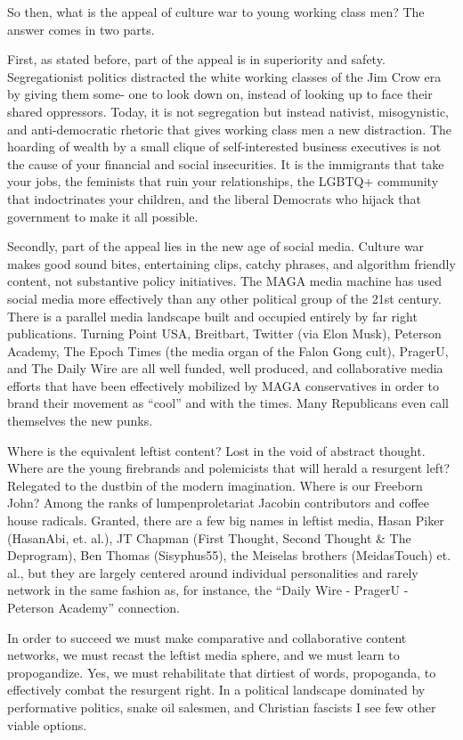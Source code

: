 \documentclass[
]{book}
\begin{document}
So then, what is the appeal of culture war to young working class men? The answer comes in two parts.

First, as stated before, part of the appeal is in superiority and safety. Segregationist politics distracted the white working classes of the Jim Crow era by giving them some- one to look down on, instead of looking up to face their shared oppressors. Today, it is not segregation but instead nativist, misogynistic, and anti-democratic rhetoric that gives working class men a new distraction. The hoarding of wealth by a small clique of self-interested business executives is not the cause of your financial and social insecurities. It is the immigrants that take your jobs, the feminists that ruin your relationships, the LGBTQ+ community that indoctrinates your children, and the liberal Democrats who hijack that government to make it all possible.

Secondly, part of the appeal lies in the new age of social media. Culture war makes good sound bites, entertaining clips, catchy phrases, and algorithm friendly content, not substantive policy initiatives. The MAGA media machine has used social media more effectively than any other political group of the 21st century. There is a parallel media landscape built and occupied entirely by far right publications. Turning Point USA, Breitbart, Twitter (via Elon Musk), Peterson Academy, The Epoch Times (the media organ of the Falon Gong cult), PragerU, and The Daily Wire are all well funded, well produced, and collaborative media efforts that have been effectively mobilized by MAGA conservatives in order to brand their movement as ``cool'' and with the times. Many Republicans even call themselves the new punks.

Where is the equivalent leftist content? Lost in the void of abstract thought. Where are the young firebrands and polemicists that will herald a resurgent left? Relegated to the dustbin of the modern imagination. Where is our Freeborn John? Among the ranks of lumpenproletariat Jacobin contributors and coffee house radicals. Granted, there are a few big names in leftist media, Hasan Piker (HasanAbi, et. al.), JT Chapman (First Thought, Second Thought \& The Deprogram), Ben Thomas (Sisyphus55), the Meiselas brothers (MeidasTouch) et. al., but they are largely centered around individual personalities and rarely network in the same fashion as, for instance, the ``Daily Wire - PragerU - Peterson Academy'' connection.

In order to succeed we must make comparative and collaborative content networks, we must recast the leftist media sphere, and we must learn to propogandize. Yes, we must rehabilitate that dirtiest of words, propoganda, to effectively combat the resurgent right. In a political landscape dominated by performative politics, snake oil salesmen, and Christian fascists I see few other viable options.
\end{document}
